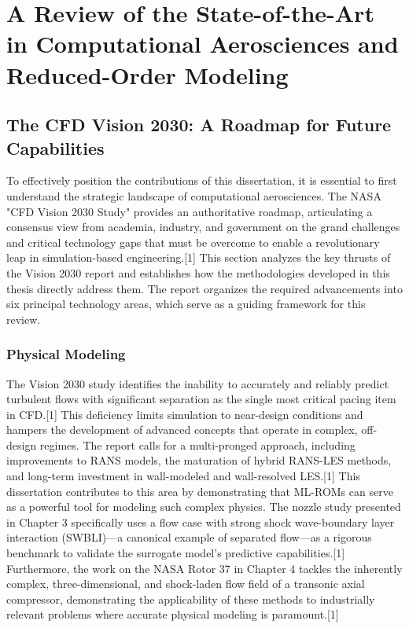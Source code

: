 \documentclass[12pt, a4paper]{report}
\begin{document}
\chapter{A Review of the State-of-the-Art in Computational Aerosciences and Reduced-Order Modeling}

\section{The CFD Vision 2030: A Roadmap for Future Capabilities}

To effectively position the contributions of this dissertation, it is essential to first understand the strategic landscape of computational aerosciences. The NASA "CFD Vision 2030 Study" provides an authoritative roadmap, articulating a consensus view from academia, industry, and government on the grand challenges and critical technology gaps that must be overcome to enable a revolutionary leap in simulation-based engineering.[1] This section analyzes the key thrusts of the Vision 2030 report and establishes how the methodologies developed in this thesis directly address them. The report organizes the required advancements into six principal technology areas, which serve as a guiding framework for this review.

\subsection{Physical Modeling}
The Vision 2030 study identifies the inability to accurately and reliably predict turbulent flows with significant separation as the single most critical pacing item in CFD.[1] This deficiency limits simulation to near-design conditions and hampers the development of advanced concepts that operate in complex, off-design regimes. The report calls for a multi-pronged approach, including improvements to RANS models, the maturation of hybrid RANS-LES methods, and long-term investment in wall-modeled and wall-resolved LES.[1] This dissertation contributes to this area by demonstrating that ML-ROMs can serve as a powerful tool for modeling such complex physics. The nozzle study presented in Chapter 3 specifically uses a flow case with strong shock wave-boundary layer interaction (SWBLI)—a canonical example of separated flow—as a rigorous benchmark to validate the surrogate model's predictive capabilities.[1] Furthermore, the work on the NASA Rotor 37 in Chapter 4 tackles the inherently complex, three-dimensional, and shock-laden flow field of a transonic axial compressor, demonstrating the applicability of these methods to industrially relevant problems where accurate physical modeling is paramount.[1]
\end{document}
